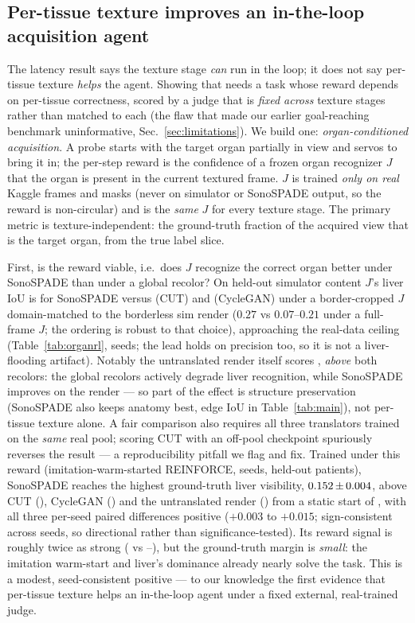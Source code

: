 \documentclass[runningheads]{llncs}
\begin{document}
\subsection{Per-tissue texture improves an in-the-loop acquisition agent}
\label{sec:organrl}
The latency result says the texture stage \emph{can} run in the loop; it does not say per-tissue texture
\emph{helps} the agent. Showing that needs a task whose reward depends on per-tissue correctness, scored
by a judge that is \emph{fixed across} texture stages rather than matched to each (the flaw that made our
earlier goal-reaching benchmark uninformative, Sec.~\ref{sec:limitations}). We build one:
\emph{organ-conditioned acquisition}. A probe starts with the target organ partially in view and servos
to bring it in; the per-step reward is the confidence of a frozen organ recognizer $J$ that the organ is
present in the current textured frame. $J$ is trained \emph{only on real} Kaggle frames and masks (never
on simulator or SonoSPADE output, so the reward is non-circular) and is the \emph{same} $J$ for every
texture stage. The primary metric is texture-independent: the ground-truth fraction of the acquired view
that is the target organ, from the true label slice.

First, is the reward viable, i.e.\ does $J$ recognize the correct organ better under SonoSPADE than under
a global recolor? On held-out simulator content $J$'s liver IoU is \recSono{} for SonoSPADE versus
\recCut{} (CUT) and \recCyc{} (CycleGAN) under a border-cropped $J$ domain-matched to the borderless sim
render ($0.27$ vs $0.07$--$0.21$ under a full-frame $J$; the ordering is robust to that choice),
approaching the real-data ceiling \recCeil{} (Table~\ref{tab:organrl}, \rlSeeds{} seeds; the lead holds
on precision too, so it is not a liver-flooding artifact). Notably the untranslated render itself scores
\recPhys{}, \emph{above} both recolors: the global recolors actively degrade liver recognition, while
SonoSPADE improves on the render --- so part of the effect is structure preservation (SonoSPADE also
keeps anatomy best, edge IoU in Table~\ref{tab:main}), not per-tissue texture alone. A fair comparison
also requires all three translators trained on the \emph{same} real pool; scoring CUT with an off-pool
checkpoint spuriously reverses the result --- a reproducibility pitfall we flag and fix. Trained under
this reward (imitation-warm-started REINFORCE, \rlSeeds{} seeds, held-out patients), SonoSPADE reaches
the highest ground-truth liver visibility, $0.152\,{\pm}\,0.004$, above CUT (\rlCut{}), CycleGAN
(\rlCyc{}) and the untranslated render (\rlPhys{}) from a static start of \rlStart{}, with all three
per-seed paired differences positive ($+0.003$ to $+0.015$; sign-consistent across \rlSeeds{} seeds, so
directional rather than significance-tested). Its reward signal is roughly twice as strong (\rewSono{}
vs \rewCut{}--\rewPhys{}), but the ground-truth margin is \emph{small}: the imitation warm-start and
liver's dominance already nearly solve the task. This is a modest, seed-consistent positive --- to our
knowledge the first evidence that per-tissue texture helps an in-the-loop agent under a fixed external,
real-trained judge.
\end{document}
